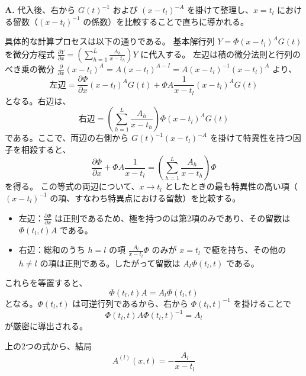 \begin{Q}[$x=t_l$ における局所表示 $Y(x,t) = \Phi(x,t)(x-t_l)^A G(t)$ をシュレジンガー系に代入すると、なぜ $\Phi(t_l, t) A \Phi(t_l, t)^{-1} = A_l$ が得られるのか？]
\textbf{A.} 代入後、右から $G(t)^{-1}$ および $(x-t_l)^{-A}$ を掛けて整理し、$x=t_l$ における留数（$(x-t_l)^{-1}$ の係数）を比較することで直ちに導かれる。

具体的な計算プロセスは以下の通りである。
基本解行列 $Y = \Phi (x-t_l)^A G(t)$ を微分方程式 $\frac{\partial Y}{\partial x} = \left( \sum_{h=1}^L \frac{A_h}{x-t_h} \right) Y$ に代入する。
左辺は積の微分法則と行列のべき乗の微分 $\frac{\partial}{\partial x}(x-t_l)^A = A(x-t_l)^{A-I} = A(x-t_l)^{-1}(x-t_l)^A$ より、
\[
  \text{左辺} = \frac{\partial \Phi}{\partial x}(x-t_l)^A G(t) + \Phi A \frac{1}{x-t_l} (x-t_l)^A G(t)
\]
となる。右辺は、
\[
  \text{右辺} = \left( \sum_{h=1}^L \frac{A_h}{x-t_h} \right) \Phi (x-t_l)^A G(t)
\]
である。ここで、両辺の右側から $G(t)^{-1} (x-t_l)^{-A}$ を掛けて特異性を持つ因子を相殺すると、
\[
  \frac{\partial \Phi}{\partial x} + \Phi A \frac{1}{x-t_l} = \left( \sum_{h=1}^L \frac{A_h}{x-t_h} \right) \Phi
\]
を得る。
この等式の両辺について、$x \to t_l$ としたときの最も特異性の高い項（$(x-t_l)^{-1}$ の項、すなわち特異点における留数）を比較する。
\begin{itemize}
    \item 左辺：$\frac{\partial \Phi}{\partial x}$ は正則であるため、極を持つのは第2項のみであり、その留数は $\Phi(t_l, t) A$ である。
    \item 右辺：総和のうち $h=l$ の項 $\frac{A_l}{x-t_l}\Phi$ のみが $x=t_l$ で極を持ち、その他の $h \neq l$ の項は正則である。したがって留数は $A_l \Phi(t_l, t)$ である。
\end{itemize}
これらを等置すると、
\[
  \Phi(t_l, t) A = A_l \Phi(t_l, t)
\]
となる。$\Phi(t_l, t)$ は可逆行列であるから、右から $\Phi(t_l, t)^{-1}$ を掛けることで
\[
  \Phi(t_l, t) A \Phi(t_l, t)^{-1} = A_l
\]
が厳密に導出される。
\end{Q}

上の2つの式から、結局
\begin{equation*}
  A^{(l)}(x,t) = - \frac{A_l}{x-t_l}
\end{equation*}

